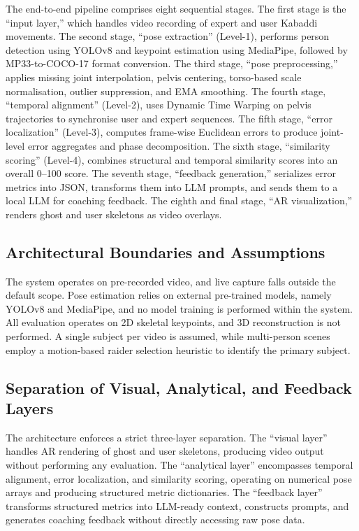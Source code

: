 The end-to-end pipeline comprises eight sequential stages. The first stage is the ``input layer,'' which handles video recording of expert and user Kabaddi movements. The second stage, ``pose extraction'' (Level-1), performs person detection using YOLOv8 and keypoint estimation using MediaPipe, followed by MP33-to-COCO-17 format conversion. The third stage, ``pose preprocessing,'' applies missing joint interpolation, pelvis centering, torso-based scale normalisation, outlier suppression, and EMA smoothing. The fourth stage, ``temporal alignment'' (Level-2), uses Dynamic Time Warping on pelvis trajectories to synchronise user and expert sequences. The fifth stage, ``error localization'' (Level-3), computes frame-wise Euclidean errors to produce joint-level error aggregates and phase decomposition. The sixth stage, ``similarity scoring'' (Level-4), combines structural and temporal similarity scores into an overall 0--100 score. The seventh stage, ``feedback generation,'' serializes error metrics into JSON, transforms them into LLM prompts, and sends them to a local LLM for coaching feedback. The eighth and final stage, ``AR visualization,'' renders ghost and user skeletons as video overlays.


\subsection{Architectural Boundaries and Assumptions}

The system operates on pre-recorded video, and live capture falls outside the default scope. Pose estimation relies on external pre-trained models, namely YOLOv8 and MediaPipe, and no model training is performed within the system. All evaluation operates on 2D skeletal keypoints, and 3D reconstruction is not performed. A single subject per video is assumed, while multi-person scenes employ a motion-based raider selection heuristic to identify the primary subject.


\subsection{Separation of Visual, Analytical, and Feedback Layers}

The architecture enforces a strict three-layer separation. The ``visual layer'' handles AR rendering of ghost and user skeletons, producing video output without performing any evaluation. The ``analytical layer'' encompasses temporal alignment, error localization, and similarity scoring, operating on numerical pose arrays and producing structured metric dictionaries. The ``feedback layer'' transforms structured metrics into LLM-ready context, constructs prompts, and generates coaching feedback without directly accessing raw pose data.


